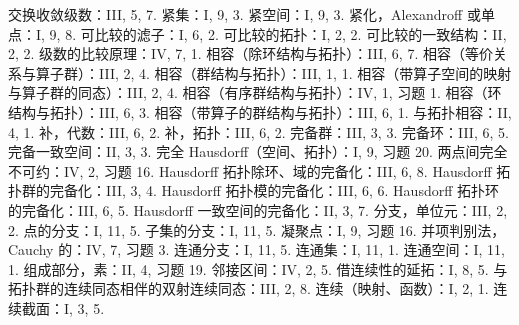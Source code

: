 \begin{Shaded}
\begin{Highlighting}[]

\end{Highlighting}
\end{Shaded}

交换收敛级数：III, 5, 7. 紧集：I, 9, 3. 紧空间：I, 9, 3. 紧化，Alexandroff 或单点：I, 9, 8. 可比较的滤子：I, 6, 2. 可比较的拓扑：I, 2, 2. 可比较的一致结构：II, 2, 2. 级数的比较原理：IV, 7, 1. 相容（除环结构与拓扑）：III, 6, 7. 相容（等价关系与算子群）：III, 2, 4. 相容（群结构与拓扑）：III, 1, 1. 相容（带算子空间的映射与算子群的同态）：III, 2, 4. 相容（有序群结构与拓扑）：IV, 1, 习题 1. 相容（环结构与拓扑）：III, 6, 3. 相容（带算子的群结构与拓扑）：III, 6, 1. 与拓扑相容：II, 4, 1. 补，代数：III, 6, 2. 补，拓扑：III, 6, 2. 完备群：III, 3, 3. 完备环：III, 6, 5. 完备一致空间：II, 3, 3. 完全 Hausdorff（空间、拓扑）：I, 9, 习题 20. 两点间完全不可约：IV, 2, 习题 16. Hausdorff 拓扑除环、域的完备化：III, 6, 8. Hausdorff 拓扑群的完备化：III, 3, 4. Hausdorff 拓扑模的完备化：III, 6, 6. Hausdorff 拓扑环的完备化：III, 6, 5. Hausdorff 一致空间的完备化：II, 3, 7. 分支，单位元：III, 2, 2. 点的分支：I, 11, 5. 子集的分支：I, 11, 5. 凝聚点：I, 9, 习题 16. 并项判别法，Cauchy 的：IV, 7, 习题 3. 连通分支：I, 11, 5. 连通集：I, 11, 1. 连通空间：I, 11, 1. 组成部分，素：II, 4, 习题 19. 邻接区间：IV, 2, 5. 借连续性的延拓：I, 8, 5. 与拓扑群的连续同态相伴的双射连续同态：III, 2, 8. 连续（映射、函数）：I, 2, 1. 连续截面：I, 3, 5.

